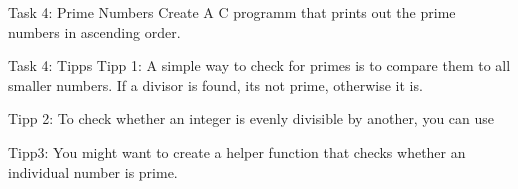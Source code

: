 \documentclass[10pt,graphics,aspectratio=169,table]{beamer}
\begin{document}
\begin{frame}[fragile]{Task 4: Prime Numbers}
Create A C programm that prints out the prime numbers in ascending order.
\end{frame}

\begin{frame}[fragile]{Task 4: Tipps}
Tipp 1: 
A simple way to check for primes is to compare them to all smaller numbers.
If a divisor is found, its not prime, otherwise it is. 

Tipp 2:
To check whether an integer is evenly divisible by another, you can use

Tipp3: You might want to create a helper function  that checks 
whether an individual number is prime.
\end{frame}
\end{document}

